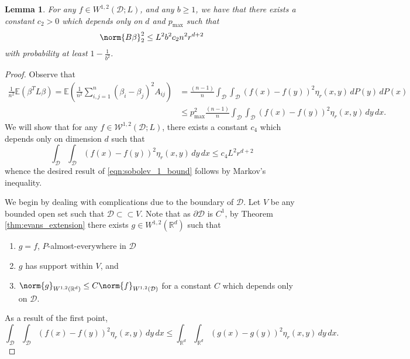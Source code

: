 \documentclass{article}
\newcommand{\Reals}{\mathbb{R}}
\newcommand{\1}{\mathbb{I}}
\newcommand{\D}{\mathcal{D}}
\newcommand{\Rd}{\Reals^d}
\newcommand{\Ebb}{\mathbb{E}}
\theoremstyle{alden}
\theoremstyle{aldenthm}
\newtheorem{lemma}{Lemma}
\theoremstyle{definition}
\theoremstyle{remark}
\begin{document}
\begin{lemma}
	\label{lem:sobolev_1_bound}
	For any $f \in W^{1,2}(\mathcal{D};L)$, and any $b \geq 1$, we have that there exists a constant $c_2 > 0$ which depends only on $d$ and $p_{\max}$ such that
	\begin{equation}
	\label{eqn:sobolev_1_bound}
	\norm{B\beta}_2^2 \leq L^2 b^2 c_2 n^2 r^{d + 2}
	\end{equation}
	with probability at least $1 - \frac{1}{b^2}$. 
\end{lemma}
\begin{proof}
	Observe that
	\begin{align*}
	\frac{1}{n^2}\Ebb(\beta^T L \beta) = \Ebb\left(\frac{1}{n^2} \sum_{i,j = 1}^{n} (\beta_i - \beta_j)^2 A_{ij}\right) & = \frac{(n - 1)}{n} \int_{\D} \int_{\D} (f(x) - f(y))^2\eta_r(x,y) \,dP(y) \,dP(x) \\
	& \leq p_{\max}^2 \frac{(n - 1)}{n} \int_{\D} \int_{\D} (f(x) - f(y))^2\eta_r(x,y) \,dy \,dx.
	\end{align*}
	We will show that for any $f \in \mathcal{W}^{1,2}(\D;L)$, there exists a constant $c_4$ which depends only on dimension $d$ such that
	\begin{equation}
	\label{eqn:mean_bound}
	\int_{\D} \int_{\D} (f(x) - f(y))^2\eta_r(x,y) \,dy \,dx \leq c_4 L^2 r^{d + 2}
	\end{equation}
	whence the desired result of \eqref{eqn:sobolev_1_bound} follows by Markov's inequality.
	
	We begin by dealing with complications due to the boundary of $\mathcal{D}$. Let $V$ be any bounded open set such that $\D \subset \subset V$. Note that as $\partial \D$ is $C^1$, by Theorem \ref{thm:evans_extension} there exists $g \in W^{1,2}(\Reals^d)$ such that
	\begin{enumerate}
		\item
		\label{eqn:evans_extension_1}
		$g = f$, $P$-almost-everywhere in $\D$
		\item 
		$g$ has support within $V$, and  
		\item 
		\label{eqn:sobolev_1_bound_2}
		$\norm{g}_{W^{1,2}(\Rd)} \leq C \norm{f}_{W^{1,2}(\D)}$ for a constant $C$ which depends only on $\mathcal{D}$.
	\end{enumerate}
	As a result of the first point,
	\begin{equation}
	\label{eqn:sobolev_1_bound_1}
	\int_{\D} \int_{\D} (f(x) - f(y))^2\eta_r(x,y) \,dy \,dx \leq \int_{\Rd} \int_{\Rd} (g(x) - g(y))^2\eta_r(x,y) \,dy \,dx.
	\end{equation}
	

\end{proof}
\end{document}
